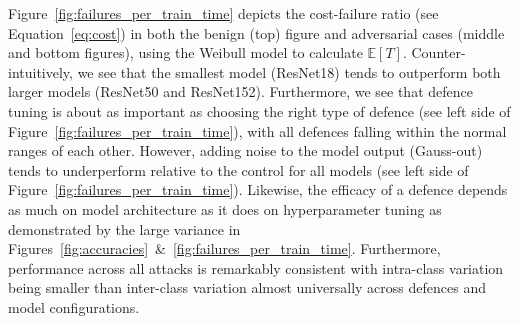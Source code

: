 Figure~\ref{fig:failures_per_train_time} depicts the cost-failure ratio (see Equation~\ref{eq:cost}) in both the benign (top) figure and adversarial cases (middle and bottom figures), using the Weibull model to calculate $\mathbb{E}[T]$. Counter-intuitively, we see that the smallest model (ResNet18) tends to outperform both larger models (ResNet50 and ResNet152). Furthermore, we see that defence tuning is about as important as choosing the right type of defence (see left side of Figure~\ref{fig:failures_per_train_time}), with all defences falling within the normal ranges of each other. However, adding noise to the model output (Gauss-out) tends to underperform relative to the control for all models (see left side of Figure~\ref{fig:failures_per_train_time}). Likewise, the efficacy of a defence depends as much on model architecture as it does on hyperparameter tuning as demonstrated by the large variance in Figures~\ref{fig:accuracies}~\&~\ref{fig:failures_per_train_time}.  Furthermore, performance across all attacks is remarkably consistent with intra-class variation being smaller than inter-class variation almost universally across defences and model configurations. 

